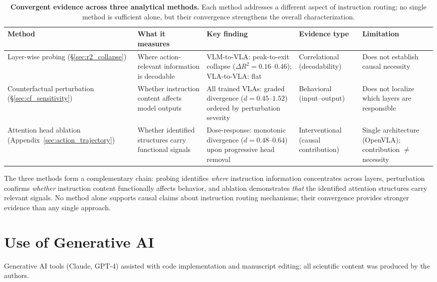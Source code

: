 \begin{table}[h]
\centering
\caption{\textbf{Convergent evidence across three analytical methods.} Each method addresses a different aspect of instruction routing; no single method is sufficient alone, but their convergence strengthens the overall characterization.}
\label{tab:convergent_evidence}
\scriptsize
\setlength{\tabcolsep}{3pt}
\begin{tabular}{@{}p{2.0cm}p{2.8cm}p{3.2cm}p{1.8cm}p{2.8cm}@{}}
\toprule
\textbf{Method} & \textbf{What it measures} & \textbf{Key finding} & \textbf{Evidence type} & \textbf{Limitation} \\
\midrule
Layer-wise probing (\S\ref{sec:r2_collapse}) & Where action-relevant information is decodable & VLM-to-VLA: peak-to-exit collapse ($\Delta R^2 = 0.16$--$0.46$); VLA-to-VLA: flat & Correlational (decodability) & Does not establish causal necessity \\
\addlinespace
Counterfactual perturbation (\S\ref{sec:cf_sensitivity}) & Whether instruction content affects model outputs & All trained VLAs: graded divergence ($d = 0.45$--$1.52$) ordered by perturbation severity & Behavioral (input--output) & Does not localize which layers are responsible \\
\addlinespace
Attention head ablation (Appendix~\ref{sec:action_trajectory}) & Whether identified structures carry functional signals & Dose-response: monotonic divergence ($d = 0.48$--$0.64$) upon progressive head removal & Interventional (causal contribution) & Single architecture (OpenVLA); contribution $\neq$ necessity \\
\bottomrule
\end{tabular}
\end{table}

The three methods form a complementary chain: probing identifies \emph{where} instruction information concentrates across layers, perturbation confirms \emph{whether} instruction content functionally affects behavior, and ablation demonstrates \emph{that} the identified attention structures carry relevant signals.
No method alone supports causal claims about instruction routing mechanisms; their convergence provides stronger evidence than any single approach.

\section{Use of Generative AI}
\label{sec:use_of_ai}

Generative AI tools (Claude, GPT-4) assisted with code implementation and manuscript editing; all scientific content was produced by the authors.

